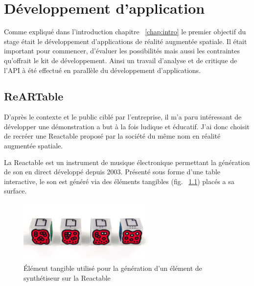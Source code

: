 \chapter{Développement d'application}

Comme expliqué dans l'introduction chapitre ~\ref{chap:intro} le premier objectif du stage était le développement d'applications de réalité augmentée spatiale. Il était important pour commencer, d'évaluer les possibilités mais aussi les contraintes qu'offrait le kit de développement.
Ainsi un travail d'analyse et de critique de l'API à été effectué en parallèle du développement d'applications.

\section{ReARTable}
\label{sec:reartable}
D'après le contexte et le public ciblé par l'entreprise, il m'a paru intéressant de développer une démonstration a but à la fois ludique et éducatif. J'ai donc choisit de recréer une Reactable\cite{reactable} proposé par la société du même nom en réalité augmentée spatiale.

La Reactable est un instrument de musique électronique permettant la génération de son en direct développé depuis 2003. Présenté sous forme d'une table interactive, le son est généré via des éléments tangibles (fig. ~\ref{fig:reactelem}) placés a sa surface. 

\begin{figure}[H]
\centering
\includegraphics[width=0.6\textwidth]{images/reactelements}
\caption{Élément tangible utilisé pour la génération d'un élément de synthétiseur sur la Reactable\protect\footnotemark}
\label{fig:reactelem}
\end{figure}


